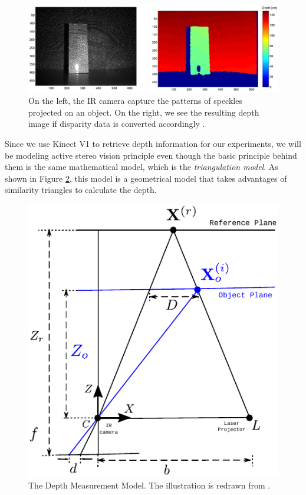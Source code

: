 \documentclass[12pt]{report}
\numberwithin{figure}{section}
\begin{document}
\begin{figure}[H]
	\centering
  \includegraphics[width=0.6\linewidth,natwidth=640,natheight=640]
  {fig/ref_imgs/kinect_depth_img.png}
  \caption[Kinect's Depth Measurement]{On the left, the IR camera capture the 
  patterns of speckles projected on an object. On the right, we see the 
  resulting depth image if disparity data is converted accordingly 
  \parencite{Khoshelham2012a}.}
	\label{fig:kinect_depth_img}
\end{figure}

Since we use Kinect V1 to retrieve depth information for our experiments, we will 
be modeling active stereo vision principle even though the basic principle 
behind them is the same mathematical model, which is the \textit{triangulation 
model}. As shown in Figure \ref{fig:triangulation_model}, this model is a 
geometrical model that takes advantages of similarity triangles to calculate 
the depth.

\begin{figure}[H]
	\centering
  \includegraphics[width=0.65\linewidth,natwidth=640,natheight=640]
  {fig/drawings/triangulation.pdf}
  \caption[The Depth Measurement Model]{The Depth Measurement Model. The 
  illustration is redrawn from \parencite{Khoshelham2012a}.}
	\label{fig:triangulation_model}
\end{figure}
\end{document}
